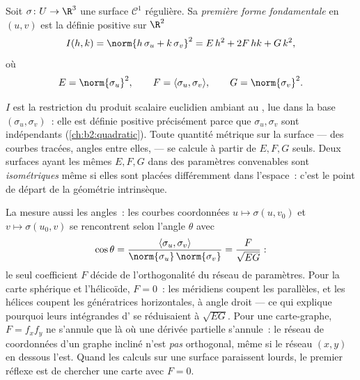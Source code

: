 \begin{definition}\label{def:b2:surfaces:fff}
Soit $\sigma \colon U \to \R^3$ une surface $\mathcal{C}^1$
régulière. Sa \emph{première forme fondamentale} en $(u,v)$ est la
 définie positive sur $\R^2$
\[
I(h, k) = \norm{h\,\sigma_u + k\,\sigma_v}^2
= E\,h^2 + 2F\,hk + G\,k^2,
\]
où
\[
E = \norm{\sigma_u}^2,
\qquad
F = \langle \sigma_u, \sigma_v\rangle,
\qquad
G = \norm{\sigma_v}^2 .
\]
\end{definition}

\begin{remark}
$I$ est la restriction du produit scalaire euclidien ambiant au
, lue dans la base $(\sigma_u, \sigma_v)$~: elle est
définie positive précisément parce que $\sigma_u, \sigma_v$ sont
indépendants (\cref{ch:b2:quadratic}). Toute quantité métrique sur la
surface ---  des courbes tracées, angles entre elles,  ---
se calcule à partir de $E, F, G$ seuls. Deux surfaces ayant les mêmes $E,
F, G$ dans des paramètres convenables sont \emph{isométriques} même si
elles sont placées différemment dans l'espace~: c'est le point de
départ de la géométrie intrinsèque.
\end{remark}

\begin{example}\label{ex:b2:surfaces:coordangle}
La  mesure aussi les angles~: les
courbes coordonnées $u \mapsto \sigma(u, v_0)$ et $v \mapsto
\sigma(u_0, v)$ se rencontrent selon l'angle $\theta$ avec
\[
\cos\theta = \frac{\langle\sigma_u,
\sigma_v\rangle}{\norm{\sigma_u}\,\norm{\sigma_v}}
= \frac{F}{\sqrt{EG}} :
\]
le seul coefficient $F$ décide de l'orthogonalité du
réseau de paramètres. Pour la carte sphérique et l'hélicoïde, $F =
0$~: les méridiens coupent les parallèles, et les hélices coupent
les génératrices horizontales, à angle droit --- ce qui explique
pourquoi leurs intégrandes d' se réduisaient à $\sqrt{EG}$.
Pour une carte-graphe, $F = f_xf_y$ ne s'annule que là où une
dérivée partielle s'annule~: le réseau de coordonnées d'un graphe
incliné n'est \emph{pas} orthogonal, même si le réseau $(x, y)$ en
dessous l'est. Quand les calculs sur une surface paraissent
lourds, le premier réflexe est de chercher une carte avec $F = 0$.
\end{example}

